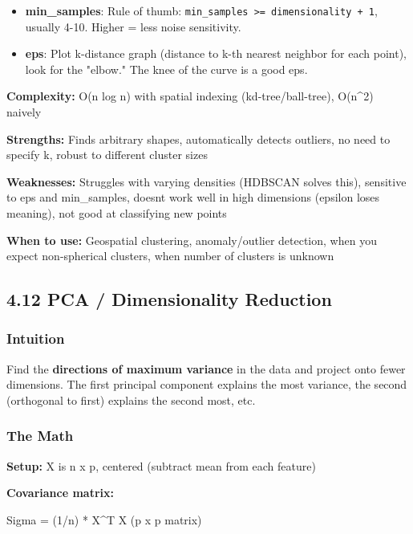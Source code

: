 \documentclass[11pt]{article}
\providecommand{\tightlist}{\setlength{\itemsep}{1pt}\setlength{\parskip}{0pt}}
\newenvironment{Shaded}{\begin{snugshade}}{\end{snugshade}}
\newcommand{\DecValTok}[1]{\textcolor[rgb]{0.96,0.45,0.00}{#1}}
\newcommand{\NormalTok}[1]{\textcolor[rgb]{0.81,0.81,0.76}{#1}}
\newcommand{\OperatorTok}[1]{\textcolor[rgb]{0.81,0.81,0.76}{#1}}
\begin{document}
\begin{itemize}
\tightlist
\item
  \textbf{min\_samples}: Rule of thumb: \texttt{min\_samples\ \textgreater{}=\ dimensionality\ +\ 1}, usually 4-10. Higher = less noise sensitivity.
\item
  \textbf{eps}: Plot k-distance graph (distance to k-th nearest neighbor for each point), look for the "elbow." The knee of the curve is a good eps.
\end{itemize}

\textbf{Complexity:} O(n log n) with spatial indexing (kd-tree/ball-tree), O(n\^{}2) naively

\textbf{Strengths:} Finds arbitrary shapes, automatically detects outliers, no need to specify k, robust to different cluster sizes

\textbf{Weaknesses:} Struggles with varying densities (HDBSCAN solves this), sensitive to eps and min\_samples, doesn\textquotesingle t work well in high dimensions (epsilon loses meaning), not good at classifying new points

\textbf{When to use:} Geospatial clustering, anomaly/outlier detection, when you expect non-spherical clusters, when number of clusters is unknown

\subsection{4.12 PCA / Dimensionality Reduction}\label{412-pca--dimensionality-reduction}

\subsubsection{Intuition}\label{intuition-11}

Find the \textbf{directions of maximum variance} in the data and project onto fewer dimensions. The first principal component explains the most variance, the second (orthogonal to first) explains the second most, etc.

\subsubsection{The Math}\label{the-math-2}

\textbf{Setup:} X is n x p, centered (subtract mean from each feature)

\textbf{Covariance matrix:}


\begin{Shaded}
\begin{Highlighting}[]
\NormalTok{Sigma }\OperatorTok{=}\NormalTok{ (}\DecValTok{1}\OperatorTok{/}\NormalTok{n) }\OperatorTok{*}\NormalTok{ X}\OperatorTok{\^{}}\NormalTok{T X     (p x p matrix)}
\end{Highlighting}
\end{Shaded}
\end{document}
